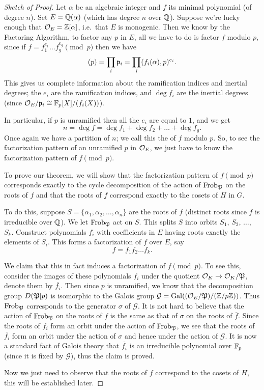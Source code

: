 \begin{proof}[Sketch of Proof]
Let $\alpha$ be an algebraic integer and $f$ its minimal polynomial (of degree $n$).
Set $E = \mathbb Q(\alpha)$ (which has degree $n$ over $\mathbb Q$).
Suppose we're lucky enough that $\mathcal O_E = \mathbb Z[\alpha]$,
i.e.\ that $E$ is monogenic.
Then we know by the Factoring Algorithm,
to factor any $p$ in $E$, all we have to do is factor $f$ modulo $p$,
since if $f = f_1^{e_1} \dots f_g^{e_g} \pmod p$ then we have
\[ (p) = \prod_i \mathfrak p_i = \prod_i (f_i(\alpha), p)^{e_i}. \]
This gives us complete information about the ramification indices and inertial degrees;
the $e_i$ are the ramification indices, and $\deg f_i$ are the inertial degrees
(since $\mathcal O_E / \mathfrak p_i \cong \mathbb F_p[X] / (f_i(X))$).

In particular, if $p$ is unramified then all the $e_i$ are equal to $1$, and we get
\[ n = \deg f = \deg f_1 + \deg f_2 + \dots + \deg f_g. \]
Once again we have a partition of $n$;
we call this the  of $f$ modulo $p$.
So, to see the factorization pattern of an unramified $p$ in $\mathcal O_E$,
we just have to know the factorization pattern of $f \pmod p$.

To prove our theorem, we will show that the factorization pattern of $f \pmod p$ corresponds exactly to the cycle decomposition of the action of $\mathrm{Frob}_{\mathfrak P}$ on the roots of $f$ and that the roots of $f$ correspond exactly to the cosets of $H$ in $G$.

To do this, suppose $S = \{ \alpha_1,\alpha_2,\dots, \alpha_n\}$ are the roots of $f$ (distinct roots since $f$ is irreducible over $\mathbb Q$). We let $\mathrm{Frob}_{\mathfrak P}$ act on $S$. This splits $S$ into orbits $S_1$, $S_2$, $\dots$, $S_k$. Construct polynomials $f_i$ with coefficients in $E$ having roots exactly the elements of $S_i$. This forms a factorization of $f$ over $E$, say \[ f = f_1f_2 \dots f_k. \]

We claim that this in fact induces a factorization of $f \pmod p$.
To see this, consider the images of these polynomials $f_i$ under the quotient $\mathcal O_K \to \mathcal O_K/\mathfrak P$, denote them by $\overline{f_i}$. Then since $p$ is unramified, we know that the decomposition group $D(\mathfrak P|p)$ is isomorphic to the Galois group $\mathcal{G} = \operatorname{Gal}((\mathcal O_E/\mathfrak P) / (\mathbb Z/p\mathbb Z))$. Thus $\mathrm{Frob}_{\mathfrak P}$ corresponds to the generator $\sigma$ of $\mathcal{G}$. It is not hard to believe that the action of $\mathrm{Frob}_{\mathfrak P}$ on the roots of $f$ is the same as that of $\sigma$ on the roots of $ \overline{f}$. Since the roots of $f_i$ form an orbit under the action of $\mathrm{Frob}_{\mathfrak P}$, we see that the roots of $\overline{f_i}$ form an orbit under the action of $\sigma$ and hence under the action of $\mathcal{G}$. It is now a standard fact of Galois theory that $\overline{f_i}$ is an irreducible polynomial over $\mathbb F_p$ (since it is fixed by $\mathcal{G}$), thus the claim is proved.

Now we just need to observe that the roots of $f$ correspond to the cosets of $H$, this will be established later.
\end{proof}

